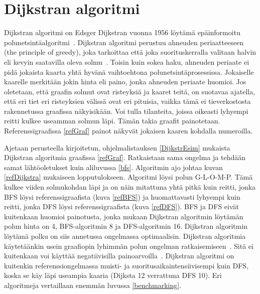 \section{Dijkstran algoritmi}\label{dijkstra}
Dijkstran algoritmi on Edsger Dijkstran vuonna 1956 löytämä epäinformoitu 
polunetsintäalgoritmi~\cite{applSciLawande}. Dijkstran algoritmi perustuu 
ahneuden periaatteeseen (the principle of greedy), joka tarkoittaa että joka 
suorituskerralla valitaan halvin eli kevyin saatavilla oleva 
solmu~\cite{mazeGameTrilogi}. Toisin kuin sokea haku, ahneuden periaate ei pidä 
jokaista kaarta yhtä hyvänä vaihtoehtona polunetsintäprosessissa. Jokaiselle 
kaarelle merkitään jokin hinta eli paino, jonka ahneuden periaate huomioi. Jos 
oletetaan, että graafin solmut ovat risteyksiä ja kaaret teitä, on suotavaa 
ajatella, että eri tiet eri risteyksien välissä ovat eri pituisia, vaikka tämä 
ei tieverkostosta rakennetussa graafissa näkyisikään. Voi tulla tilanteita, 
joissa oikeasti lyhyempi reitti kulkee useamman solmun läpi. Tämän takia 
graafit painotetaan. Referenssigraafissa \ref{refGraf} painot näkyvät jokaisen 
kaaren kohdalla numeroilla. \par
	Ajetaan \textcite{applSciLawande} perusteella kirjoitetun, 
ohjelmalistauksen \ref{DijkstrEsim} mukaista Dijkstran algoritmia graafissa 
\ref{refGraf}. Ratkaistaan sama ongelma ja tehdään samat lähtöoletukset kuin 
aliluvussa \ref{bfs}. Algoritmin ajo johtaa kuvan \ref{refDijkstra} mukaiseen 
lopputulokseen. Algoritmi löysi polun G-L-O-M-P. Tämä kulkee viiden 
solmukohdan läpi ja on näin mitattuna yhtä pitkä kuin reitti, jonka BFS löysi 
referenssigraafista (kuva \ref{refBFS}) ja huomattavasti lyhyempi kuin 
reitti, jonka DFS löysi referenssigraafista (kuva \ref{refDFS}). BFS ja DFS 
eivät kuitenkaan huomioi painotusta, jonka mukaan Dijkstran algoritmin 
löytämän polun hinta on 4, BFS-algoritmin 8 ja DFS-algoritmin 16. Dijkstran 
algoritmin löytämä polku on siis annetussa ongelmassa optimaalisin. Dijkstran 
algoritmia käytetäänkin usein graafiopin lyhimmän polun ongelman 
ratkaisemiseen~\cite{IOPDijkstra}. Sitä ei kuitenkaan voi käyttää 
negatiivisilla painoarvoilla~\cite{applSciLawande}. Dijkstran algoritmi on 
kuitenkin referenssiongelmassa muisti- ja suoritusaikaintensiivisempi kuin 
DFS, koska se käy läpi useampia kaaria (Dijksta 12 verrattuna DFS 10). Eri 
algoritmeja vertaillaan enemmän luvussa \ref{benchmarking}.

